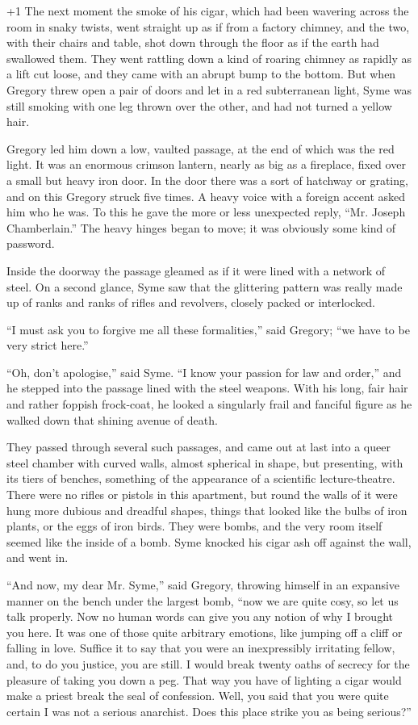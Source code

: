 \looseness+1
The next moment the smoke of his cigar, which had been wavering across the room in snaky twists, went straight up as if from a factory chimney, and the two, with their chairs and table, shot down through the floor as if the earth had swallowed them. They went rattling down a kind of roaring chimney as rapidly as a lift cut loose, and they came with an abrupt bump to the bottom. But when Gregory threw open a pair of doors and let in a red subterranean light, Syme was still smoking with one leg thrown over the other, and had not turned a yellow hair.

Gregory led him down a low, vaulted passage, at the end of which was the red light. It was an enormous crimson lantern, nearly as big as a fireplace, fixed over a small but heavy iron door. In the door there was a sort of hatchway or grating, and on this Gregory struck five times. A heavy voice with a foreign accent asked him who he was. To this he gave the more or less unexpected reply, “Mr. Joseph Chamberlain.” The heavy hinges began to move; it was obviously some kind of password.

Inside the doorway the passage gleamed as if it were lined with a network of steel. On a second glance, Syme saw that the glittering pattern was really made up of ranks and ranks of rifles and revolvers, closely packed or interlocked.

“I must ask you to forgive me all these formalities,” said Gregory; “we have to be very strict here.”

“Oh, don’t apologise,” said Syme. “I know your passion for law and order,” and he stepped into the passage lined with the steel weapons. With his long, fair hair and rather foppish frock-coat, he looked a singularly frail and fanciful figure as he walked down that shining avenue of death.

They passed through several such passages, and came out at last into a queer steel chamber with curved walls, almost spherical in shape, but presenting, with its tiers of benches, something of the appearance of a scientific lecture-theatre. There were no rifles or pistols in this apartment, but round the walls of it were hung more dubious and dreadful shapes, things that looked like the bulbs of iron plants, or the eggs of iron birds. They were bombs, and the very room itself seemed like the inside of a bomb. Syme knocked his cigar ash off against the wall, and went in.

“And now, my dear Mr. Syme,” said Gregory, throwing himself in an expansive manner on the bench under the largest bomb, “now we are quite cosy, so let us talk properly. Now no human words can give you any notion of why I brought you here. It was one of those quite arbitrary emotions, like jumping off a cliff or falling in love. Suffice it to say that you were an inexpressibly irritating fellow, and, to do you justice, you are still. I would break twenty oaths of secrecy for the pleasure of taking you down a peg. That way you have of lighting a cigar would make a priest break the seal of confession. Well, you said that you were quite certain I was not a serious anarchist. Does this place strike you as being serious?”

